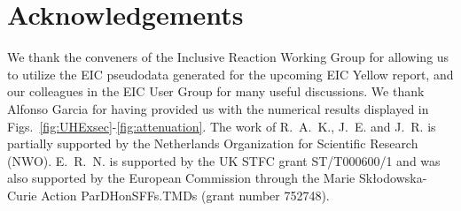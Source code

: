\documentclass[11pt,a4paper]{article}
\begin{document}
\section*{Acknowledgements}
We thank the conveners of the Inclusive Reaction Working Group for allowing us
to utilize the EIC pseudodata generated for the upcoming EIC Yellow report, and
our colleagues in the EIC User Group for many useful discussions. We thank
Alfonso Garcia for having provided us with the numerical results displayed
in Figs.~\ref{fig:UHExsec}-\ref{fig:attenuation}. The work of R.~A.~K., J.~E.
and J.~R. is partially supported by the Netherlands Organization for Scientific
Research (NWO). E.~R.~N. is supported by the UK STFC grant ST/T000600/1 and was
also supported by the European Commission through the Marie Sk\l odowska-Curie
Action ParDHonSFFs.TMDs (grant number 752748).
\end{document}
